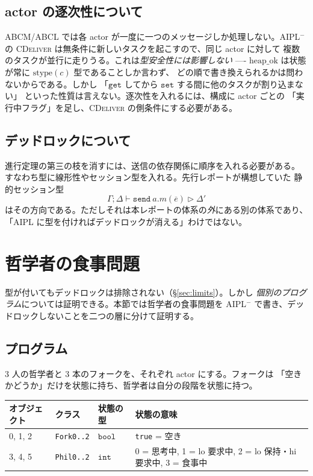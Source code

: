 \documentclass[11pt,a4paper]{ltjsarticle}
\theoremstyle{definition}
\theoremstyle{remark}
\newcommand{\tint}{\mathtt{int}}
\newcommand{\tbool}{\mathtt{bool}}
\newcommand{\stype}{\mathrm{stype}}
\newcommand{\heapok}{\mathrm{heap\_ok}}
\begin{document}
\subsection{actor の逐次性について}

ABCM/ABCL では各 actor が一度に一つのメッセージしか処理しない。AIPL$^-$ の
\textsc{CDeliver} は無条件に新しいタスクを起こすので、同じ actor に対して
複数のタスクが並行に走りうる。これは\emph{型安全性には影響しない}
---- $\heapok$ は状態が常に $\stype(c)$ 型であることしか言わず、
どの順で書き換えられるかは問わないからである。しかし
「$\mathtt{get}$ してから $\mathtt{set}$ する間に他のタスクが割り込まない」
といった性質は言えない。逐次性を入れるには、構成に actor ごとの
「実行中フラグ」を足し、\textsc{CDeliver} の側条件にする必要がある。

\subsection{デッドロックについて}

進行定理の第三の枝を消すには、送信の依存関係に順序を入れる必要がある。
すなわち型に線形性やセッション型を入れる。先行レポートが構想していた
静的セッション型
\[
\Gamma;\Delta \vdash \mathtt{send}\ a.m(\overline{e}) \rhd \Delta'
\]
はその方向である。ただしそれは本レポートの体系の\emph{外}にある別の体系であり、
「AIPL に型を付ければデッドロックが消える」わけではない。


\section{哲学者の食事問題}
\label{sec:dining}

型が付いてもデッドロックは排除されない（\S\ref{sec:limits}）。しかし
\emph{個別のプログラム}については証明できる。本節では哲学者の食事問題を
AIPL$^-$ で書き、デッドロックしないことを二つの層に分けて証明する。

\subsection{プログラム}

3 人の哲学者と 3 本のフォークを、それぞれ actor にする。フォークは
「空きかどうか」だけを状態に持ち、哲学者は自分の段階を状態に持つ。

\begin{center}
\begin{tabular}{@{}llll@{}}
\toprule
オブジェクト & クラス & 状態の型 & 状態の意味 \\
\midrule
0, 1, 2 & \texttt{Fork0..2} & $\tbool$ & \texttt{true} = 空き \\
3, 4, 5 & \texttt{Phil0..2} & $\tint$
  & 0 = 思考中, 1 = lo 要求中, 2 = lo 保持・hi 要求中, 3 = 食事中 \\
\bottomrule
\end{tabular}
\end{center}
\end{document}
